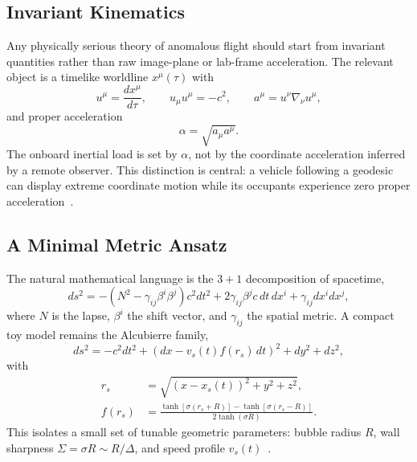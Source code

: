 \documentclass[aps,prd,twocolumn,superscriptaddress,nofootinbib,floatfix]{revtex4-2}
\begin{document}
\subsection{Invariant Kinematics}\label{sec:invariant-kinematics}

Any physically serious theory of anomalous flight should start from invariant
quantities rather than raw image-plane or lab-frame acceleration. The relevant
object is a timelike worldline $x^\mu(\tau)$ with
\begin{equation}
u^\mu = \frac{dx^\mu}{d\tau},\qquad
u_\mu u^\mu = -c^2,\qquad
a^\mu = u^\nu \nabla_\nu u^\mu,
\label{eq:s09-kinematics}
\end{equation}
and proper acceleration
\begin{equation}
\alpha = \sqrt{a_\mu a^\mu}.
\label{eq:s09-proper-acceleration}
\end{equation}
The onboard inertial load is set by $\alpha$, not by the coordinate acceleration
inferred by a remote observer. This distinction is central: a vehicle following
a geodesic can display extreme coordinate motion while its occupants experience
zero proper acceleration~\cite{MTW1973,Wald1984,Touboul2022}.

\subsection{A Minimal Metric Ansatz}\label{sec:minimal-metric}

The natural mathematical language is the $3+1$ decomposition of spacetime,
\begin{equation}
ds^2 = -(N^2-\gamma_{ij}\beta^i\beta^j)c^2dt^2
+ 2\gamma_{ij}\beta^j c\,dt\,dx^i
+ \gamma_{ij}dx^i dx^j,
\label{eq:s09-adm}
\end{equation}
where $N$ is the lapse, $\beta^i$ the shift vector, and $\gamma_{ij}$ the
spatial metric. A compact toy model remains the Alcubierre family,
\begin{equation}
ds^2 = -c^2 dt^2 + \left(dx - v_s(t) f(r_s)\,dt\right)^2 + dy^2 + dz^2,
\label{eq:s09-alcubierre}
\end{equation}
with
\begin{equation}
\begin{aligned}
r_s &= \sqrt{(x-x_s(t))^2+y^2+z^2},\\
f(r_s) &= \frac{\tanh[\sigma(r_s+R)]-\tanh[\sigma(r_s-R)]}
{2\tanh(\sigma R)}.
\end{aligned}
\label{eq:s09-shape}
\end{equation}
This isolates a small set of tunable geometric parameters: bubble radius $R$,
wall sharpness $\Sigma = \sigma R \sim R/\Delta$, and speed profile
$v_s(t)$~\cite{Alcubierre1994,MTW1973,Wald1984}.
\end{document}
